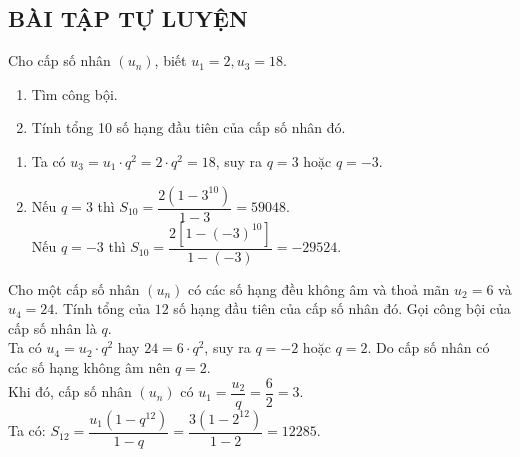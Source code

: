 \subsection{BÀI TẬP TỰ LUYỆN}


\begin{baitap}%
	Cho cấp số nhân $(u_n)$, biết $u_1=2,u_3=18$.
	\begin{enumerate}
		\item Tìm công bội.
		\item Tính tổng 10 số hạng đầu tiên của cấp số nhân đó.
	\end{enumerate}
	\loigiai
	{
		\begin{enumerate}
			\item Ta có $u_3=u_1\cdot q^2=2\cdot q^2=18$, suy ra $q=3$ hoặc $q=-3$.
			\item Nếu $q=3$ thì $S_{10}=\dfrac{2\left(1-3^{10}\right)}{1-3}=59048$.\\
			Nếu $q=-3$ thì $S_{10}=\dfrac{2\left[1-(-3)^{10}\right]}{1-(-3)}=-29524$.
		\end{enumerate}
	}
\end{baitap}
\begin{baitap}%
	Cho một cấp số nhân $(u_n)$ có các số hạng đều không âm và thoả mãn $u_2=6$ và $u_4=24$. Tính tổng của $12$ số hạng đầu tiên của cấp số nhân đó.
	\loigiai
	{
		Gọi công bội của cấp số nhân là $q$.\\
		Ta có $u_4=u_2\cdot q^2$ hay $24=6\cdot q^2$, suy ra $q=-2$ hoặc $q=2$. Do cấp số nhân có các số hạng không âm nên $q=2$.\\
		Khi đó, cấp số nhân $(u_n)$ có $u_1=\dfrac{u_2}{q}=\dfrac{6}{2}=3$.\\
		Ta có: $S_{12}=\dfrac{u_1\left(1-q^{12}\right)}{1-q}=\dfrac{3\left(1-2^{12}\right)}{1-2}=12285$.
	}
\end{baitap}
